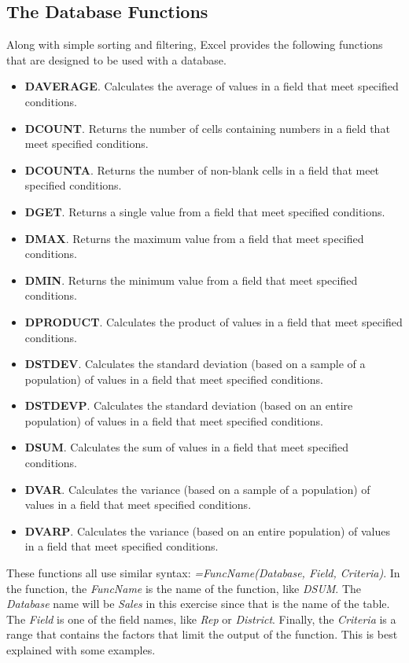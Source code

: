 \subsection{The Database Functions}

Along with simple sorting and filtering, Excel provides the following functions that are designed to be used with a database. 

\begin{itemize}
	\item \textbf{DAVERAGE}. Calculates the average of values in a field that meet specified conditions.
	\item \textbf{DCOUNT}. Returns the number of cells containing numbers in a field that meet specified conditions.
	\item \textbf{DCOUNTA}. Returns the number of non-blank cells in a field that meet specified conditions.
	\item \textbf{DGET}. Returns a single value from a field that meet specified conditions.
	\item \textbf{DMAX}. Returns the maximum value from a field that meet specified conditions.
	\item \textbf{DMIN}. Returns the minimum value from a field that meet specified conditions.
	\item \textbf{DPRODUCT}. Calculates the product of values in a field that meet specified conditions.
	\item \textbf{DSTDEV}. Calculates the standard deviation (based on a sample of a population) of values in a field that meet specified conditions.
	\item \textbf{DSTDEVP}. Calculates the standard deviation (based on an entire population) of values in a field that meet specified conditions.
	\item \textbf{DSUM}. Calculates the sum of values in a field that meet specified conditions.
	\item \textbf{DVAR}. Calculates the variance (based on a sample of a population) of values in a field that meet specified conditions.
	\item \textbf{DVARP}. Calculates the variance (based on an entire population) of values in a field that meet specified conditions.
\end{itemize}

These functions all use similar syntax: \textit{=FuncName(Database, Field, Criteria)}. In the function, the \textit{FuncName} is the name of the function, like \textit{DSUM}. The \textit{Database} name will be \textit{Sales} in this exercise since that is the name of the table. The \textit{Field} is one of the field names, like \textit{Rep} or \textit{District}. Finally, the \textit{Criteria} is a range that contains the factors that limit the output of the function. This is best explained with some examples.

